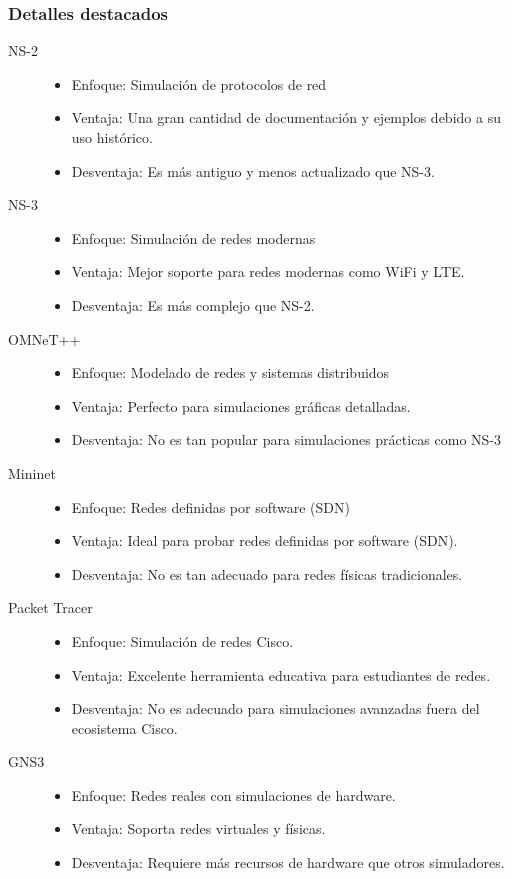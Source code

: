 \subsubsection*{Detalles destacados}
\begin{description}
  \item[NS-2]  
  \begin{itemize}
    \item Enfoque: Simulación de protocolos de red
    \item Ventaja: Una gran cantidad de documentación y ejemplos debido a su uso histórico.  
    \item Desventaja: Es más antiguo y menos actualizado que NS-3.
  \end{itemize}
  
  \item[NS-3]   
  \begin{itemize}
    \item Enfoque: Simulación de redes modernas
    \item Ventaja: Mejor soporte para redes modernas como WiFi y LTE.
    \item Desventaja: Es más complejo que NS-2.
  \end{itemize}
  
  \item[OMNeT++]
  \begin{itemize}
    \item Enfoque: Modelado de redes y sistemas distribuidos
    \item Ventaja: Perfecto para simulaciones gráficas detalladas.
    \item Desventaja: No es tan popular para simulaciones prácticas como NS-3
  \end{itemize}

  \item[Mininet]
  \begin{itemize}
    \item Enfoque: Redes definidas por software (SDN)
    \item Ventaja: Ideal para probar redes definidas por software (SDN).
    \item Desventaja: No es tan adecuado para redes físicas tradicionales.
  \end{itemize}
  
  \item[Packet Tracer]
  \begin{itemize}
    \item Enfoque: Simulación de redes Cisco.
    \item Ventaja: Excelente herramienta educativa para estudiantes de redes.
    \item Desventaja: No es adecuado para simulaciones avanzadas fuera del ecosistema Cisco.
  \end{itemize}

  \item[GNS3]
  \begin{itemize}
    \item Enfoque: Redes reales con simulaciones de hardware.
    \item Ventaja: Soporta redes virtuales y físicas.
    \item Desventaja: Requiere más recursos de hardware que otros simuladores.
  \end{itemize}
\end{description}
